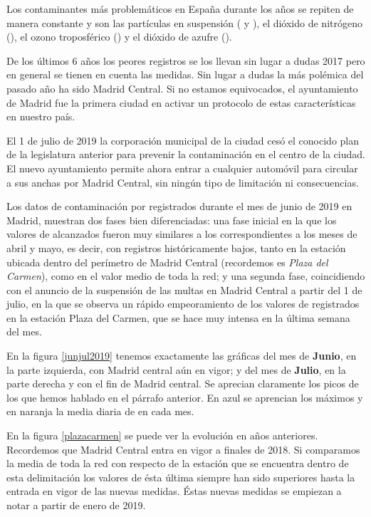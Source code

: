 \begin{itemize}
	Los contaminantes más problemáticos en España durante los años se repiten de manera constante y son las	partículas en suspensión ( y ), el dióxido de nitrógeno (), el ozono troposférico () y el dióxido de azufre (). 
	
	De los últimos 6 años los peores registros se los llevan sin lugar a dudas 2017 pero en general se tienen en cuenta las medidas. Sin lugar a dudas la más polémica del pasado año ha sido Madrid Central. Si no estamos equivocados, el ayuntamiento de Madrid fue la primera ciudad en activar un protocolo \cite{protocolo} de estas características en nuestro país. 

	El 1 de julio de 2019 la corporación municipal de la ciudad cesó el conocido plan de la legislatura anterior para prevenir la contaminación en el centro de la ciudad. El nuevo ayuntamiento permite ahora entrar a cualquier automóvil para circular a sus anchas por Madrid Central, sin ningún tipo de
	limitación ni consecuencias. 
		
		Los datos de contaminación por  registrados durante el mes de junio de 2019 en Madrid, muestran dos fases bien diferenciadas: una fase inicial en la que los valores de  alcanzados fueron muy similares a los correspondientes a los meses de abril y mayo, es
		decir, con registros históricamente bajos, tanto en la estación ubicada dentro del perímetro de Madrid Central (recordemos es \textit{Plaza del Carmen}), como en el valor medio de toda la red; y una segunda fase, coincidiendo con el anuncio de la
		suspensión de las multas en Madrid Central a partir del 1 de julio, en la que se observa un rápido empeoramiento de los valores de  registrados en la estación Plaza del Carmen, que se hace muy intensa en la última semana
		del mes. 
		
		En la figura \ref{junjul2019} tenemos exactamente las gráficas del mes de \textbf{Junio}, en la parte izquierda, con Madrid central aún en vigor; y del mes de \textbf{Julio}, en la parte derecha y con el fin de Madrid central. Se aprecian claramente los picos de los que hemos hablado en el párrafo anterior. En azul se aprencian los máximos y en naranja la media diaria de  en cada mes.
		
		
		En la figura \ref{plazacarmen} se puede ver la evolución en años anteriores. Recordemos que Madrid Central entra en vigor a finales de 2018. Si comparamos la media de toda la red con respecto de la estación que se encuentra dentro de esta delimitación los valores de ésta última siempre han sido superiores hasta la entrada en vigor de las nuevas medidas. Éstas nuevas medidas se empiezan a notar a partir de enero de 2019.
		

\end{itemize}
